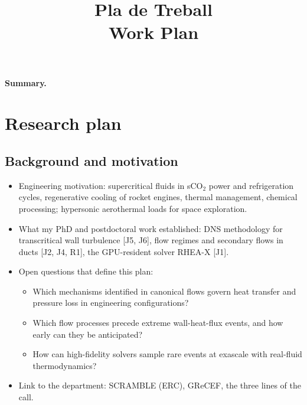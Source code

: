 \documentclass[11pt]{article}
\title{\textbf{Pla de Treball}\\[2pt]\large Work Plan}
\author{\Large \CandName}
\date{}
\begin{document}
\maketitle
\thispagestyle{plain}
\vspace{0.5cm}
\begin{center}\postdata\end{center}

\vspace{0.8cm}
\noindent\textbf{Summary.}

\newpage
\tableofcontents

\section{Research plan}

\subsection{Background and motivation}
\begin{itemize}
  \item Engineering motivation: supercritical fluids in sCO$_2$ power and refrigeration
  cycles, regenerative cooling of rocket engines, thermal management, chemical processing;
  hypersonic aerothermal loads for space exploration. 
  \item What my PhD and postdoctoral work established: DNS methodology for transcritical
  wall turbulence [J5, J6], flow regimes and secondary flows in ducts [J2, J4, R1], the
  GPU-resident solver RHEA-X [J1].
  \item Open questions that define this plan:
  \begin{itemize}
    \item Which mechanisms identified in canonical flows govern heat transfer and pressure
    loss in engineering configurations?
    \item Which flow processes precede extreme wall-heat-flux events, and how early can
    they be anticipated?
    \item How can high-fidelity solvers sample rare events at exascale with real-fluid
    thermodynamics?
  \end{itemize}
  \item Link to the department: SCRAMBLE (ERC), GReCEF, the three lines of the call.
\end{itemize}
\end{document}
